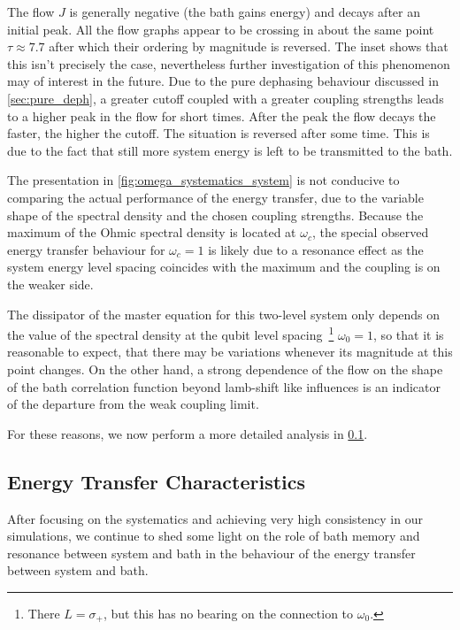 The flow \(J\) is generally negative (the bath gains energy) and
decays after an initial peak. All the flow graphs appear to be
crossing in about the same point \(τ\approx 7.7\) after which their
ordering by magnitude is reversed.  The inset shows that this isn't
precisely the case, nevertheless further investigation of this
phenomenon may of interest in the future.  Due to the pure dephasing
behaviour discussed in \cref{sec:pure_deph}, a greater cutoff coupled
with a greater coupling strengths leads to a higher peak in the flow
for short times. After the peak the flow decays the faster, the higher
the cutoff. The situation is reversed after some time.  This is due to
the fact that still more system energy is left to be transmitted to
the bath.

The presentation in \cref{fig:omega_systematics_system} is not
conducive to comparing the actual performance of the energy transfer,
due to the variable shape of the spectral density and the chosen
coupling strengths. Because the maximum of the Ohmic spectral density
is located at \(ω_c\), the special observed energy transfer behaviour
for \(ω_c=1\) is likely due to a resonance effect as the system energy
level spacing coincides with the maximum and the coupling is on the
weaker side.

The dissipator of the master equation for this two-level system only
depends on the value of the spectral density at the qubit level
spacing~\cite[p. 66]{Rivas2012}\footnote{There \(L=σ_{+}\), but this
  has no bearing on the connection to \(ω_{0}\).}  \(ω_{0}=1\), so
that it is reasonable to expect, that there may be variations whenever
its magnitude at this point changes.  On the other hand, a strong
dependence of the flow on the shape of the bath correlation function
beyond lamb-shift like influences is an indicator of the departure
from the weak coupling limit.  

For these reasons, we now perform a more detailed analysis in
\cref{sec:energy-transf-char}.

\subsection{Energy Transfer Characteristics}
\label{sec:energy-transf-char}
After focusing on the systematics and achieving very high consistency
in our simulations, we continue to shed some light on the role of bath
memory and resonance between system and bath in the behaviour of the
energy transfer between system and bath.


